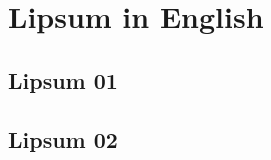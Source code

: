 
\chapter{Lipsum in English}
\label{app:LipsumEng}

\section{Lipsum 01}
\lipsum[1-1]

\section{Lipsum 02}
\lipsum[2-2]